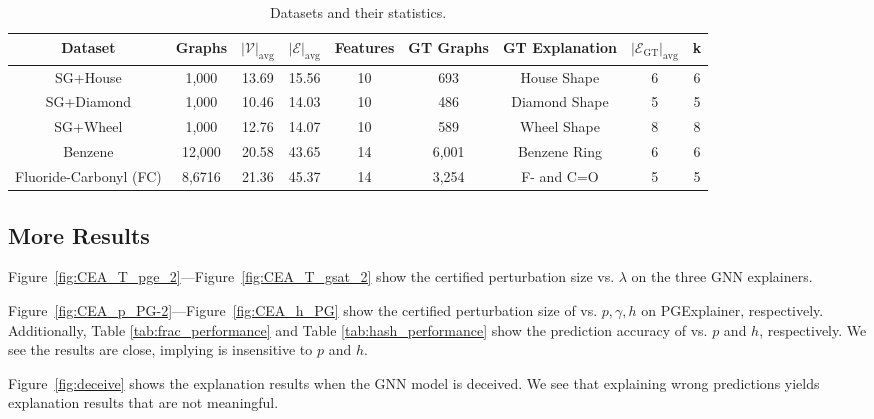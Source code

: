 \begin{table}[!t]
    \centering
    \scriptsize
    \begin{tabular}{ccccccccc}
		\toprule
         Dataset& Graphs&$|\mathcal{V}|_{\text{avg}}$&$|\mathcal{E}|_{\text{avg}}$&Features&GT Graphs&GT Explanation&$|\mathcal{E}_{\text{GT}}|_{\text{avg}}$&k\\
         \midrule
         
         SG+House&1,000&13.69&15.56& 10&693&House Shape&6&6\\
         SG+Diamond& 1,000&10.46&14.03&10&486&Diamond Shape&5&5\\
         SG+Wheel&1,000& 12.76&14.07 & 10&589&Wheel Shape&8&8\\
         \midrule
         Benzene& 12,000&20.58&43.65&14&6,001 &Benzene Ring&6&6\\
         Fluoride-Carbonyl (FC) & 8,6716&21.36&45.37&14& 3,254 &F- and C=O& 5 & 5 \\
         \bottomrule
    \end{tabular}
    \vspace{-2mm}
    \caption{Datasets and their statistics.}
    \vspace{-4mm}
    \label{tab:Datasets}
\end{table}




{\subsection{More Results}}
\label{app:moreresults}


{ 
Figure~\ref{fig:CEA_T_pge_2}---Figure~\ref{fig:CEA_T_gsat_2} show the certified perturbation size vs. $\lambda$ on the three GNN explainers. 

Figure~\ref{fig:CEA_p_PG-2}---Figure~\ref{fig:CEA_h_PG} show the certified perturbation size of {\name} vs. $p, \gamma, h$ on PGExplainer, respectively. Additionally, Table \ref{tab:frac_performance}  and Table \ref{tab:hash_performance}  show the prediction accuracy of {\name}  vs. $p$ and $h$, respectively. We see the results are close, implying {\name}  is insensitive to $p$ and $h$. 
}


Figure~\ref{fig:deceive} shows the explanation results when the GNN model is deceived. We see that explaining wrong predictions yields explanation results that are not meaningful. 


